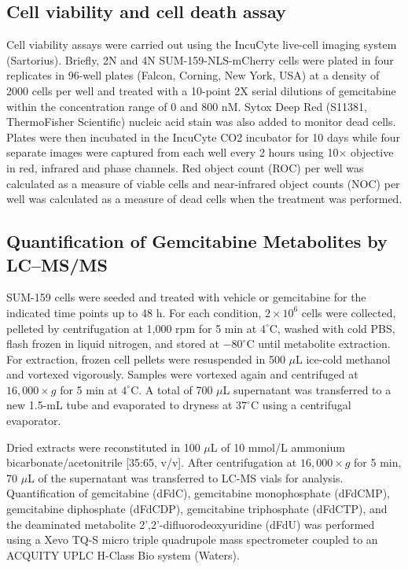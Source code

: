 \documentclass[11pt,notitlepage]{article}
\begin{document}
\subsection{Cell viability and cell death assay}   \label{sec:methods-live-dead-assay}
Cell viability assays were carried out using the IncuCyte live-cell imaging system (Sartorius). Briefly, 2N and 4N SUM-159-NLS-mCherry cells were plated in four replicates in 96-well plates (Falcon, Corning, New York, USA) at a density of 2000 cells per well and treated with a 10-point 2X serial dilutions of gemcitabine within the concentration range of 0 and 800 nM. Sytox Deep Red (S11381, ThermoFisher Scientific) nucleic acid stain was also added to monitor dead cells. Plates were then incubated in the IncuCyte CO2 incubator for 10 days while four separate images were captured from each well every 2 hours using 10× objective in red, infrared and phase channels. Red object count (ROC) per well was calculated as a measure of viable cells and near-infrared object counts (NOC) per well was calculated as a measure of dead cells when the treatment was performed.
\subsection{Quantification of Gemcitabine Metabolites by LC–MS/MS}

SUM-159 cells were seeded and treated with vehicle or gemcitabine for the indicated time points up to 48 h. For each condition, $2 \times 10^{6}$ cells were collected, pelleted by centrifugation at 1,000 rpm for 5 min at $4^\circ$C, washed with cold PBS, flash frozen in liquid nitrogen, and stored at $-80^\circ$C until metabolite extraction. For extraction, frozen cell pellets were resuspended in 500 $\mu$L ice-cold methanol and vortexed vigorously. Samples were vortexed again and centrifuged at $16,000 \times g$ for 5 min at $4^\circ$C. A total of 700 $\mu$L supernatant was transferred to a new 1.5-mL tube and evaporated to dryness at $37^\circ$C using a centrifugal evaporator.

Dried extracts were reconstituted in 100 $\mu$L of 10 mmol/L ammonium bicarbonate/acetonitrile [35:65, v/v]. After centrifugation at $16,000 \times g$ for 5 min, 70 $\mu$L of the supernatant was transferred to LC-MS vials for analysis. Quantification of gemcitabine (dFdC), gemcitabine monophosphate (dFdCMP), gemcitabine diphosphate (dFdCDP), gemcitabine triphosphate (dFdCTP), and the deaminated metabolite 2',2'-difluorodeoxyuridine (dFdU) was performed using a Xevo TQ-S micro triple quadrupole mass spectrometer coupled to an ACQUITY UPLC H-Class Bio system (Waters).
\end{document}
